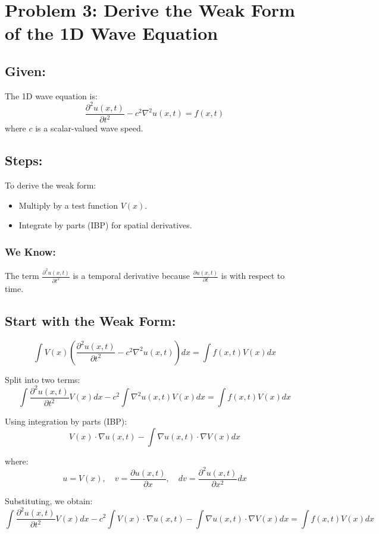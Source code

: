 \documentclass[11pt]{article}
\begin{document}
\section*{Problem 3: Derive the Weak Form of the 1D Wave Equation}

\subsection*{Given:}
The 1D wave equation is:
\[
\frac{\partial^2 u(x, t)}{\partial t^2} - c^2 \nabla^2 u(x, t) = f(x, t)
\]
where \(c\) is a scalar-valued wave speed.

\subsection*{Steps:}
To derive the weak form:
\begin{itemize}
    \item Multiply by a test function \(V(x)\).
    \item Integrate by parts (IBP) for spatial derivatives.
\end{itemize}

\subsubsection*{We Know:}
The term \(\frac{\partial^2 u(x, t)}{\partial t^2}\) is a temporal derivative because \(\frac{\partial u(x, t)}{\partial t}\) is with respect to time.

\subsection*{Start with the Weak Form:}
\[
\int V(x) \left( \frac{\partial^2 u(x, t)}{\partial t^2} - c^2 \nabla^2 u(x, t) \right) dx = \int f(x, t) V(x) dx
\]

Split into two terms:
\[
\int \frac{\partial^2 u(x, t)}{\partial t^2} V(x) dx - c^2 \int \nabla^2 u(x, t) V(x) dx = \int f(x, t) V(x) dx
\]

Using integration by parts (IBP):
\[
V(x) \cdot \nabla u(x, t) - \int \nabla u(x, t) \cdot \nabla V(x) dx
\]

where:
\[
u = V(x), \quad v = \frac{\partial u(x, t)}{\partial x}, \quad dv = \frac{\partial^2 u(x, t)}{\partial x^2} dx
\]

Substituting, we obtain:
\[
\int \frac{\partial^2 u(x, t)}{\partial t^2} V(x) dx - c^2 \int V(x) \cdot \nabla u(x, t) - \int \nabla u(x, t) \cdot \nabla V(x) dx = \int f(x, t) V(x) dx
\]
\end{document}
